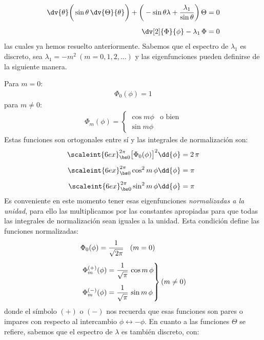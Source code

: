 \begin{align*}
\dv{\theta} \bigg( \sin \theta \, \dv{\Theta}{\theta} \bigg) + \bigg( - \sin \theta \lambda + \dfrac{\lambda_{1}}{\sin \theta} \bigg) \, \Theta &= 0 \\[0.5em]
\dv[2]{\Phi}{\phi} - \lambda_{1} \, \Phi &= 0
\end{align*}
las cuales ya hemos resuelto anteriormente. Sabemos que el espectro de $\lambda_{1}$ es discreto, sea $\lambda_{1} = - m^{2} ~ (m = 0, 1, 2, \ldots)$ y las eigenfunciones pueden definirse de la siguiente manera.
\par
\noindent
Para $m = 0$:
\begin{align*}
\Phi_{0} (\phi) = 1
\end{align*}
para $m \neq 0$:
\begin{align*}
\Phi_{m} (\phi) = \begin{cases}
\cos m \phi & \mbox{o bien} \\
\sin m \phi
\end{cases}
\end{align*}
Estas funciones son ortogonales entre sí y las integrales de normalización son:
\begin{align*}
\scaleint{6ex}_{\bs 0}^{2 \pi} \big[ \Phi_{0} (\phi) \big]^{2} \dd{\phi} &= 2 \, \pi \\[0.5em]
\scaleint{6ex}_{\bs 0}^{2 \pi} \cos^{2} m \, \phi \dd{\phi} &= \pi \\[0.5em]
\scaleint{6ex}_{\bs 0}^{2 \pi} \sin^{2} m \, \phi \dd{\phi} &= \pi
\end{align*}
Es conveniente en este momento tener esas eigenfunciones \emph{normalizadas a la unidad}, para ello las multiplicamos por las constantes apropiadas para que todas las integrales de normalización sean iguales a la unidad. Esta condición define las funciones normalizadas:
\begin{align*}
&\Phi_{0} (\phi) = \dfrac{1}{\sqrt{2 \pi}} \hspace{0.3cm} (m = 0) \\[0.5em]
&\left. \begin{aligned}
\Phi_{m}^{(+)} (\phi) &= \dfrac{1}{\sqrt{\pi}} \, \cos m \, \phi \\[0.5em]
\Phi_{m}^{(-)} (\phi) &= \dfrac{1}{\sqrt{\pi}} \, \sin m \, \phi
\end{aligned} \right\}
(m \neq 0)
\end{align*}
donde el símbolo $(+)$ o $(-)$ nos recuerda que esas funciones son pares o impares con respecto al intercambio $\phi \leftrightarrow - \phi$. En cuanto a las funciones $\Theta$ se refiere, sabemos que el espectro de $\lambda$ es también discreto, con:
